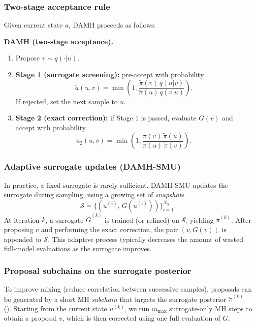 \subsubsection{Two-stage acceptance rule}
Given current state $u$, DAMH proceeds as follows:
\begin{mdframed}
\noindent\textbf{DAMH (two-stage acceptance).}
\begin{enumerate}
\item Propose $v \sim q(\cdot|u)$.
\item \textbf{Stage 1 (surrogate screening):} pre-accept with probability
\[
\widetilde{a}(u,v)=\min\!\left(1,\frac{\widetilde{\pi}(v)\,q(u|v)}{\widetilde{\pi}(u)\,q(v|u)}\right).
\]
If rejected, set the next sample to $u$.
\item \textbf{Stage 2 (exact correction):} if Stage 1 is passed, evaluate $G(v)$ and accept with probability
\[
a_2(u,v)=\min\!\left(1,\frac{\pi(v)\,\widetilde{\pi}(u)}{\pi(u)\,\widetilde{\pi}(v)}\right).
\]
\end{enumerate}
\end{mdframed}

\subsubsection{Adaptive surrogate updates (DAMH-SMU)}
In practice, a fixed surrogate is rarely sufficient. DAMH-SMU updates the surrogate during sampling,
using a growing set of \emph{snapshots}
\begin{equation}
  \mathcal{S}=\bigl\{(u^{(i)},\, G(u^{(i)}))\bigr\}_{i=1}^{N_S}.
\end{equation}
At iteration $k$, a surrogate $\widetilde{G}^{(k)}$ is trained (or refined) on $\mathcal{S}$, yielding
$\widetilde{\pi}^{(k)}$. After proposing $v$ and performing the exact correction, the pair $(v,G(v))$
is appended to $\mathcal{S}$. This adaptive process typically decreases the amount of wasted full-model
evaluations as the surrogate improves.

\subsubsection{Proposal subchains on the surrogate posterior}
\label{subsec:subchains}
To improve mixing (reduce correlation between successive samples), proposals can be generated by a short
MH \emph{subchain} that targets the surrogate posterior $\widetilde{\pi}^{(k)}$ (\cite{Subchains}). Starting
from the current state $u^{(k)}$, we run $m_{\max}$ surrogate-only MH steps to obtain a proposal $v$,
which is then corrected using one full evaluation of $G$.

